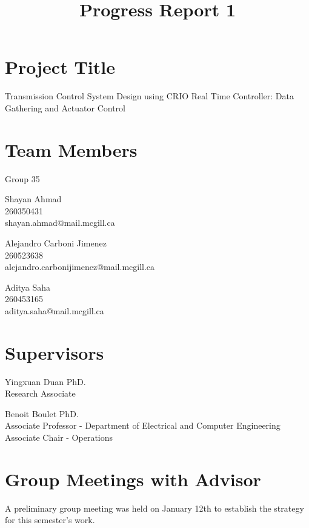 \documentclass[12pt]{article}
\begin{document}
\title{Progress Report 1}
\date{}
\maketitle
\section*{Project Title} 
Transmission Control System Design using CRIO Real Time Controller:
Data Gathering and Actuator Control
\section*{Team Members}
Group 35 \newline

\hangindent=17.62482pt
Shayan Ahmad \\
260350431 \\
shayan.ahmad@mail.mcgill.ca \newline

\hangindent=17.62482pt
Alejandro Carboni Jimenez \\
260523638 \\
alejandro.carbonijimenez@mail.mcgill.ca \newline

\hangindent=17.62482pt
Aditya Saha \\
260453165 \\
aditya.saha@mail.mcgill.ca

\section*{Supervisors}
\hangindent=17.62482pt
Yingxuan Duan PhD.\\ 
Research Associate\newline 

\hangindent=17.62482pt
Benoit Boulet PhD.\\
Associate Professor - Department of Electrical and Computer Engineering\\
Associate Chair - Operations

\newpage
\section*{Group Meetings with Advisor}
A preliminary group meeting was held on January 12th to establish the
strategy for this semester's work. \newline
\end{document}
